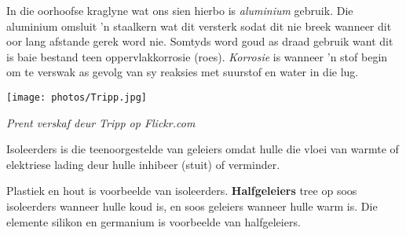 \begin{minipage}{0.5\textwidth}In die oorhoofse kraglyne wat ons sien hierbo
is \textsl{aluminium} gebruik. Die aluminium omsluit  'n staalkern wat dit versterk sodat dit nie breek wanneer dit oor lang afstande gerek word nie. Somtyds word goud as draad gebruik want dit is baie bestand teen oppervlakkorrosie (roes). \textsl{Korrosie} is wanneer 'n stof begin om te verswak as gevolg van sy reaksies met suurstof en water in die lug.\par 
\end{minipage}
\begin{minipage}{.5\textwidth}
\begin{center}
 \texttt{[image: photos/Tripp.jpg]}\par
\textit{Prent verskaf deur Tripp op Flickr.com}
\end{center}
\end{minipage}
{Isoleerders is die teenoorgestelde van geleiers omdat hulle die vloei van warmte of elektriese lading deur hulle inhibeer (stuit) of verminder.\par}
Plastiek en hout is voorbeelde van isoleerders. \textbf{Halfgeleiers} tree op soos isoleerders wanneer hulle koud is, en soos geleiers wanneer hulle warm is. Die elemente silikon en germanium is voorbeelde van halfgeleiers.\par
\label{m38706*secfhsst!!!underscore!!!id357}
